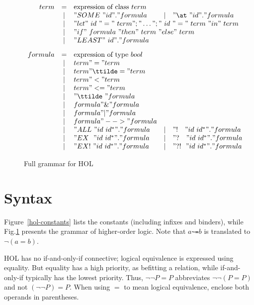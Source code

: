 \begin{figure}
\dquotes
\[\begin{array}{rclcl}
    term & = & \hbox{expression of class~$term$} \\
         & | & "SOME~" id " . " formula
         & | & "\at~" id " . " formula \\
         & | & 
    \multicolumn{3}{l}{"let"~id~"="~term";"\dots";"~id~"="~term~"in"~term} \\
         & | & 
    \multicolumn{3}{l}{"if"~formula~"then"~term~"else"~term} \\
         & | & "LEAST"~ id " . " formula \\[2ex]
 formula & = & \hbox{expression of type~$bool$} \\
         & | & term " = " term \\
         & | & term " \ttilde= " term \\
         & | & term " < " term \\
         & | & term " <= " term \\
         & | & "\ttilde\ " formula \\
         & | & formula " \& " formula \\
         & | & formula " | " formula \\
         & | & formula " --> " formula \\
         & | & "ALL~" id~id^* " . " formula
         & | & "!~~~" id~id^* " . " formula \\
         & | & "EX~~" id~id^* " . " formula 
         & | & "?~~~" id~id^* " . " formula \\
         & | & "EX!~" id~id^* " . " formula
         & | & "?!~~" id~id^* " . " formula \\
  \end{array}
\]
\caption{Full grammar for HOL} \label{hol-grammar}
\end{figure} 


\section{Syntax}

Figure~\ref{hol-constants} lists the constants (including infixes and
binders), while Fig.\ts\ref{hol-grammar} presents the grammar of
higher-order logic.  Note that $a$\verb|~=|$b$ is translated to
$\lnot(a=b)$.

\begin{warn}
  HOL has no if-and-only-if connective; logical equivalence is expressed using
  equality.  But equality has a high priority, as befitting a relation, while
  if-and-only-if typically has the lowest priority.  Thus, $\lnot\lnot P=P$
  abbreviates $\lnot\lnot (P=P)$ and not $(\lnot\lnot P)=P$.  When using $=$
  to mean logical equivalence, enclose both operands in parentheses.
\end{warn}

